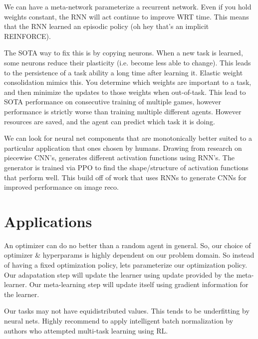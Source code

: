 \documentclass[american]{IEEEtran}   	%
\begin{document}
We can have a meta-network parameterize a recurrent network\cite{wang2016learning}.
Even if you hold weights constant, the RNN will act continue to improve WRT time.
This means that the RNN learned an episodic policy (oh hey that's an implicit REINFORCE).

The SOTA way to fix this is by copying neurons.
When a new task is learned, some neurons reduce their plasticity (i.e. become less able to change).
This leads to the persistence of a task ability a long time after learning it.
Elastic weight consolidation\cite{rusu2018metalearning} mimics this.
You determine which weights are important to a task, and then minimize the updates to those weights when out-of-task.
This lead to SOTA performance on consecutive training of multiple games, however performance is strictly worse than training multiple different agents.
However resources are saved, and the agent can predict which task it is doing.

We can look for neural net components that are monotonically better suited to a particular application that ones chosen by humans.
Drawing from research on piecewise CNN's, \cite{ramach2017searching} generates different activation functions using RNN's.
The generator is trained via PPO to find the shape/structure of activation functions that perform well.
This build off of work that uses RNNs to generate CNNs for improved performance on image reco\cite{zoph2016neural}.




\section{Applications}
An optimizer can do no better than a random agent in general\cite{585893}.
So, our choice of optimizer \& hyperparams is highly dependent on our problem domain.
So instead of having a fixed optimization policy, lets parameterize our optimization policy\cite{andrychowicz2016learning}.
Our adapatation step will update the learner using update provided by the meta-learner.
Our meta-learning step will update itself using gradient information for the learner.

Our tasks may not have equidistributed values.
This tends to be underfitting by neural nets.
Highly recommend to apply intelligent batch normalization\cite{ioffe2015batch} by authors who attempted multi-task learning using RL.
\end{document}
